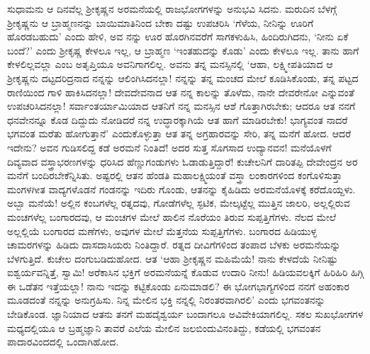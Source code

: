 ಸುಧಾಮನು ಆ ದಿನವೆಲ್ಲ ಶ್ರೀಕೃಷ್ಣನ ಅರಮನೆಯಲ್ಲಿ ರಾಜಭೋಗಗಳನ್ನು ಅನುಭವಿ ಸಿದನು. ಮರುದಿನ ಬೆಳಗ್ಗೆ ಶ್ರೀಕೃಷ್ಣನು ಆ ಬ್ರಾಹ್ಮಣನನ್ನು ಬಾಯಿಮಾತಿನಿಂದ ಬೇಕಾ ದಷ್ಟು ಉಪಚರಿಸಿ ‘ಗೆಳೆಯ, ನೀನಿನ್ನು ಊರಿಗೆ ಹೊರಡಬಹುದು’ ಎಂದು ಹೇಳಿ, ಅವ ನನ್ನು ಊರ ಹೊರಗಿನವರೆಗೆ ಸಾಗಕಳುಹಿಸಿ, ಹಿಂದಿರುಗಿದನು, ‘ನೀನು ಏಕೆ ಬಂದೆ?’ ಎಂದು ಶ್ರೀಕೃಷ್ಣ ಕೇಳಲೂ ಇಲ್ಲ, ಆ ಬ್ರಾಹ್ಮಣ ‘ಇಂತಹುದನ್ನು ಕೊಡು’ ಎಂದು ಕೇಳಲೂ ಇಲ್ಲ. ತಾನು ಹಾಗೆ ಕೇಳಲಿಲ್ಲವಲ್ಲಾ ಎಂಬ ಅತೃಪ್ತಿಯೂ ಅವನಿಗಾಗಲಿಲ್ಲ. ಅವನು ತನ್ನ ಮನಸ್ಸಿನಲ್ಲಿ ‘ಆಹಾ, ಲಕ್ಷ್ಮೀಪತಿಯಾದ ಆ ಶ್ರೀಕೃಷ್ಣನು ದಟ್ಟದರಿದ್ರನಾದ ನನ್ನನ್ನು ಆಲಿಂಗಿಸಿದನಲ್ಲಾ! ನನ್ನನ್ನು ತನ್ನ ಮಂಚದ ಮೇಲೆ ಕೂಡಿಸಿಕೊಂಡು, ತನ್ನ ಪಟ್ಟದ ರಾಣಿಯಿಂದ ಗಾಳಿ ಹಾಕಿಸಿದನಲ್ಲಾ! ದೇವದೇವನಾದ ಆತ ನನ್ನ ಕಾಲನ್ನು ತೊಳೆದು, ನಾನೇ ದೇವರೇನೋ ಎನ್ನುವಂತೆ ಉಪಚರಿಸಿದನಲ್ಲಾ! ಸರ್ವಾಂತರ್ಯಾಮಿಯಾದ ಆತನಿಗೆ ನನ್ನ ಮನಸ್ಸಿನ ಆಶೆ ಗೊತ್ತಾಗಿರಬೇಕು; ಆದರೂ ಆತ ನನಗೆ ಧನವೇನನ್ನೂ ಕೊಡ ದಿದ್ದುದು ನೋಡಿದರೆ ನನ್ನ ಉದ್ಧಾರಕ್ಕಾಗಿಯೆ ಆತ ಹಾಗೆ ಮಾಡಿರಬೇಕು! ಭಾಗ್ಯವಂತ ನಾದರೆ ಭಗವಂತ ಮರೆತು ಹೋಗುತ್ತಾನೆ’ ಎಂದುಕೊಳ್ಳುತ್ತಾ ಆತ ತನ್ನ ಅಗ್ರಹಾರವನ್ನು ಸೇರಿ, ತನ್ನ ಮನೆಗೆ ಹೋದ. ಆದರೆ ಇದೇನು? ಅವನ ಗುಡಿಸಲಿದ್ದ ಕಡೆ ಅರಮನೆ ನಿಂತಿದೆ! ಅದರ ಸುತ್ತ ಸೊಗಸಾದ ಉದ್ಯಾನವನ! ಮನೆಯೊಳಗೆ ದಿವ್ಯವಾದ ವಸ್ತ್ರಾಭರಣಗಳನ್ನು ಧರಿಸಿದ ಹೆಣ್ಣುಗಂಡುಗಳು ಓಡಾಡುತ್ತಿದ್ದಾರೆ! ಕುಚೇಲನಿಗೆ ದಾರಿತಪ್ಪಿ ದೇವೇಂದ್ರನ ಅರ ಮನೆಗೆ ಬಂದಿರಬೇಕೆನ್ನಿಸಿತು. ಅಷ್ಟರಲ್ಲಿ ಆತನ ಹೆಂಡತಿ ಮಹಾಲಕ್ಷ್ಮಿಯಂತೆ ವಸ್ತ್ರಾ ಲಂಕಾರಗಳಿಂದ ಕಂಗೊಳಿಸುತ್ತಾ ಮಂಗಳಗೀತ ವಾದ್ಯಗಳೊಡನೆ ಗಂಡನನ್ನು ಇದಿರು ಗೊಂಡು, ಆತನನ್ನು ಕೈಹಿಡಿದು ಅರಮನೆಯೊಳಕ್ಕೆ ಕರೆದೊಯ್ದಳು. ಅಬ್ಬಾ ಮನೆಯೆ! ಅಲ್ಲಿನ ಕಂಬಗಳೆಲ್ಲ ರತ್ನದವು, ಗೋಡೆಗಳೆಲ್ಲ ಸ್ಫಟಿಕ, ಮೇಲ್ಕಟ್ಟೆಲ್ಲ ಮುತ್ತಿನ ಜಾಲರಿ, ಅಲ್ಲಲ್ಲಿರುವ ಮಂಚಗಳೆಲ್ಲ ಬಂಗಾರದವು, ಆ ಮಂಚಗಳ ಮೇಲೆ ಹಾಲಿನ ನೊರೆಯಂ ತಿರುವ ಸುಪ್ಪತ್ತಿಗೆಗಳು. ನೆಲದ ಮೇಲೆ ಅಲ್ಲಲ್ಲಿಯೆ ಬಂಗಾರದ ಮಣೆಗಳು, ಅವುಗಳ ಮೇಲೆ ಮೆತ್ತನೆಯ ಸುಪ್ಪತ್ತಿಗೆಗಳು. ಬಂಗಾರದ ಹಿಡಿಯುಳ್ಳ ಚಾಮರಗಳನ್ನು ಹಿಡಿದು ದಾಸದಾಸಿಯರು ನಿಂತಿದ್ದಾರೆ. ರತ್ನದ ದೀವಿಗೆಗಳಿಂದ ತಂಪಾದ ಬೆಳಕು ಅರಮನೆಯನ್ನು ಬೆಳಗುತ್ತಿದೆ. ಕುಚೇಲ ದಂಗುಬಡಿದುಹೋದ. ಆತ ‘ಆಹಾ ಶ್ರೀಕೃಷ್ಣನ ಮಹಿಮೆಯೆ! ನಾನು ಕೇಳದೆಯೆ ನೀನಿಷ್ಟು ಐಶ್ವರ್ಯವನ್ನಿತ್ತೆ, ಸ್ವಾಮಿ! ಅರೆಕಾಸಿನ ಭಕ್ತಿಗೆ ಅರಮನೆಯನ್ನೆ ಕೊಡುವ ಉದಾರಿ ನೀನು! ಹಿಡಿಯವಲಕ್ಕಿಗೆ ಹಿರಿಹಿರಿ ಹಿಗ್ಗಿ ಈ ಒಡೆತನ ಇತ್ತೆಯಲ್ಲಾ! ನಾನು ಇದನ್ನು ಕಟ್ಟಿಕೊಂಡು ಏನುಮಾಡಲಿ? ಈ ಭೋಗಭಾಗ್ಯಗಳಿಂದ ನನಗೆ ಅಹಂಕಾರ ಮೂಡದಂತೆ ನನ್ನನ್ನು ಅನುಗ್ರಹಿಸು. ನಿನ್ನ ಮೇಲಿನ ಭಕ್ತಿ ನನ್ನಲ್ಲಿ ನಿರಂತರವಾಗಿರಲಿ’ ಎಂದು ಭಗವಂತನನ್ನು ಬೇಡಿಕೊಂಡ. ಜ್ಞಾನಿಯಾದ ಆತನು ತನಗೆ ಮಹದೈಶ್ವರ್ಯ ಬಂದಾಗಲೂ ಅವಿವೇಕಿಯಾಗಲಿಲ್ಲ. ಸಕಲ ಸುಖಭೋಗಗಳ ಮಧ್ಯದಲ್ಲಿಯೂ ಆ ಬ್ರಹ್ಮಜ್ಞಾನಿ ತಾವರೆ ಎಲೆಯ ಮೇಲಿನ ಜಲಬಿಂದುವಿನಂತಿದ್ದು, ಕಡೆಯಲ್ಲಿ ಭಗವಂತನ ಪಾದಾರವಿಂದದಲ್ಲಿ ಒಂದಾಗಿಹೋದ.

